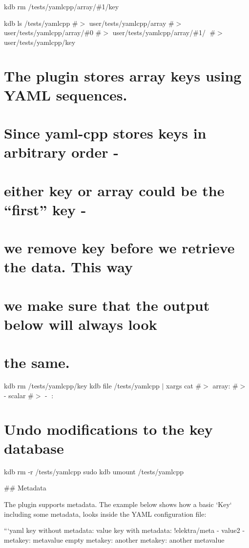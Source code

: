 kdb rm /tests/yamlcpp/array/\#1/key

kdb ls /tests/yamlcpp \#$>$ user/tests/yamlcpp/array \#$>$ user/tests/yamlcpp/array/\#0 \#$>$ user/tests/yamlcpp/array/\#1/🔑 \#$>$ user/tests/yamlcpp/key

\section*{The plugin stores array keys using Y\+A\+ML sequences.}

\section*{Since yaml-\/cpp stores keys in arbitrary order -\/}

\section*{either {\ttfamily key} or {\ttfamily array} could be the “first” key -\/}

\section*{we remove {\ttfamily key} before we retrieve the data. This way}

\section*{we make sure that the output below will always look}

\section*{the same.}

kdb rm /tests/yamlcpp/key kdb file /tests/yamlcpp $\vert$ xargs cat \#$>$ array\+: \#$>$ -\/ scalar \#$>$ -\/ 🔑\+: 🙈

\section*{Undo modifications to the key database}

kdb rm -\/r /tests/yamlcpp sudo kdb umount /tests/yamlcpp 
\begin{DoxyCode}
## Metadata

The plugin supports metadata. The example below shows how a basic `Key` including some metadata, looks
       inside the YAML configuration file:

```yaml
key without metadata: value
key with metadata:
  !elektra/meta
    - value2
    - metakey: metavalue
      empty metakey:
      another metakey: another metavalue
\end{DoxyCode}


